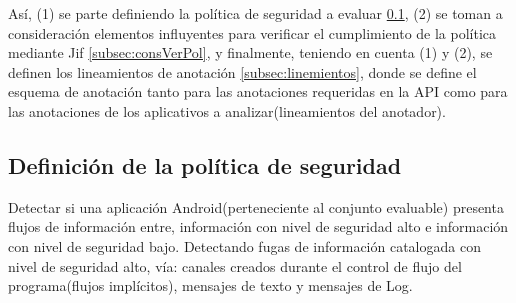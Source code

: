 % 
% 

Así, (1) se parte definiendo la política de seguridad a evaluar
\ref{subsection:politica}, (2) se toman a consideración elementos influyentes
para verificar el cumplimiento de la política mediante Jif
\ref{subsec:consVerPol}, y finalmente, teniendo en cuenta (1) y (2), se definen
los lineamientos de anotación \ref{subsec:linemientos}, donde se define el
esquema de anotación tanto para las anotaciones requeridas en la API como para
las anotaciones de los aplicativos a analizar(lineamientos del anotador).

\subsection{Definición de la política de seguridad}
\label{subsection:politica}
Detectar si una aplicación Android(perteneciente al conjunto evaluable) presenta
flujos de información entre, información con nivel de seguridad alto e
información con nivel de seguridad bajo.\newline
Detectando fugas de información catalogada con nivel de seguridad alto, vía:
canales creados durante el control de flujo del programa(flujos implícitos),
mensajes de texto y mensajes de Log.\newline 

